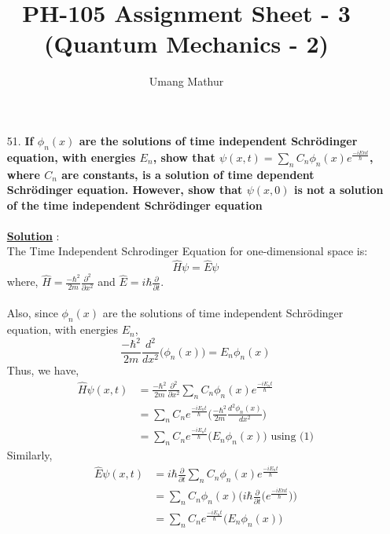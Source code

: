 \documentclass[10pt, a4paper]{article}
\begin{document}
	\title{PH-105 Assignment Sheet - 3 (Quantum Mechanics - 2)}
	\date{}
	\author{Umang Mathur}
	\maketitle
	\begin{enumerate}
		\item[51.] {\bf If $\phi_{n}(x)$ are the solutions of time independent Schrödinger equation, with energies $E_{n}$, show that $\psi(x,t) =  \sum\limits_{n} C_n\phi_{n}(x)e^{\frac{-iE{n}t}{\hbar}} $, where $C_{n}$ are constants, is a solution of time dependent Schrödinger equation. However, show that $\psi(x,0)$ is not a solution of the time independent Schrödinger equation}\\\\
		{\underline {\bf Solution}} :\\
		The Time Independent Schrodinger Equation for one-dimensional space is:
		\[ \hat{H}\psi = \hat{E}\psi\]
		where, $\hat{H} = \frac{-\hbar^{2}}{2m}\frac{\partial^{2}}{\partial x^{2}}$ and $\hat{E} = i\hbar\frac{\partial}{\partial t}$.\\\\
		Also, since $\phi_{n}(x)$ are the solutions of time independent Schrödinger equation, with energies $E_{n}$,
		\begin{equation}
			\frac{-\hbar^{2}}{2m}\frac{d^{2}}{d x^{2}}\bigg(\phi_n(x)\bigg) = E_n\phi_n(x)
		\end{equation}
		Thus, we have,
		\begin{align*}
			\hat{H}\psi(x,t) &= \frac{-\hbar^{2}}{2m}\frac{\partial^{2}}{\partial x^{2}}\sum\limits_{n} C_n\phi_{n}(x)e^{\frac{-iE_{n}t}{\hbar}}\\
			&= \sum\limits_{n} C_n e^{\frac{-iE_{n}t}{\hbar}} \bigg( \frac{-\hbar^{2}}{2m}\frac{d^{2}\phi_n(x)}{d x^{2}}\bigg)\\
			&= \sum\limits_{n} C_n e^{\frac{-iE_{n}t}{\hbar}} \bigg(E_n\phi_n(x)\bigg) \text{   using (1)}
		\end{align*}
		Similarly,
		\begin{align*}
			\hat{E}\psi(x,t) &= i\hbar\frac{\partial}{\partial t}\sum\limits_{n} C_n\phi_{n}(x)e^{\frac{-iE_{n}t}{\hbar}}\\
			&= \sum\limits_{n} C_n \phi_n(x) \bigg( i\hbar\frac{\partial}{\partial t}\Big( e^{\frac{-iE{n}t}{\hbar}} \Big)\bigg)\\
			&= \sum\limits_{n} C_n e^{\frac{-iE_{n}t}{\hbar}} \bigg(E_n\phi_n(x)\bigg)
		\end{align*}

\end{enumerate}
\end{document}
